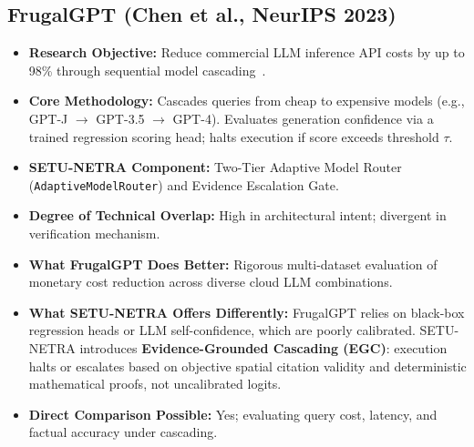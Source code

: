 \documentclass[11pt,a4paper]{article}
\begin{document}
\subsection{FrugalGPT (Chen et al., NeurIPS 2023)}
\begin{itemize}[leftmargin=*]
    \item \textbf{Research Objective:} Reduce commercial LLM inference API costs by up to 98\% through sequential model cascading~\cite{Chen2023FrugalGPT}.
    \item \textbf{Core Methodology:} Cascades queries from cheap to expensive models (e.g., GPT-J $\rightarrow$ GPT-3.5 $\rightarrow$ GPT-4). Evaluates generation confidence via a trained regression scoring head; halts execution if score exceeds threshold $\tau$.
    \item \textbf{SETU-NETRA Component:} Two-Tier Adaptive Model Router (\texttt{AdaptiveModelRouter}) and Evidence Escalation Gate.
    \item \textbf{Degree of Technical Overlap:} High in architectural intent; divergent in verification mechanism.
    \item \textbf{What FrugalGPT Does Better:} Rigorous multi-dataset evaluation of monetary cost reduction across diverse cloud LLM combinations.
    \item \textbf{What SETU-NETRA Offers Differently:} FrugalGPT relies on black-box regression heads or LLM self-confidence, which are poorly calibrated. SETU-NETRA introduces \textbf{Evidence-Grounded Cascading (EGC)}: execution halts or escalates based on objective spatial citation validity and deterministic mathematical proofs, not uncalibrated logits.
    \item \textbf{Direct Comparison Possible:} Yes; evaluating query cost, latency, and factual accuracy under cascading.
\end{itemize}

\end{document}
